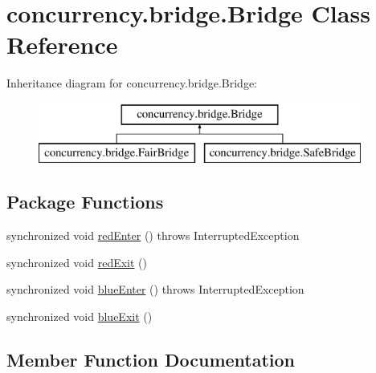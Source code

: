 \hypertarget{classconcurrency_1_1bridge_1_1_bridge}{}\section{concurrency.\+bridge.\+Bridge Class Reference}
\label{classconcurrency_1_1bridge_1_1_bridge}
Inheritance diagram for concurrency.\+bridge.\+Bridge\+:\begin{figure}[H]
\begin{center}
\leavevmode
\includegraphics[height=2.000000cm]{classconcurrency_1_1bridge_1_1_bridge}
\end{center}
\end{figure}
\subsection*{Package Functions}
\begin{DoxyCompactItemize}
\item 
synchronized void \mbox{\hyperlink{classconcurrency_1_1bridge_1_1_bridge_a7982b9ef7be674502b81fa044e641fac}{red\+Enter}} ()  throws Interrupted\+Exception 
\item 
synchronized void \mbox{\hyperlink{classconcurrency_1_1bridge_1_1_bridge_a0a06653bf84948f239379486b85e32f9}{red\+Exit}} ()
\item 
synchronized void \mbox{\hyperlink{classconcurrency_1_1bridge_1_1_bridge_aec49c327212e021acf464cdd1fc3e7e4}{blue\+Enter}} ()  throws Interrupted\+Exception 
\item 
synchronized void \mbox{\hyperlink{classconcurrency_1_1bridge_1_1_bridge_a7b2b68541d7c5f8843e442260b469e8e}{blue\+Exit}} ()
\end{DoxyCompactItemize}


\subsection{Member Function Documentation}
\mbox{\label{classconcurrency_1_1bridge_1_1_bridge_aec49c327212e021acf464cdd1fc3e7e4}} 
